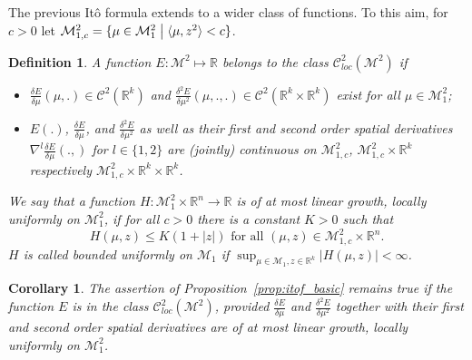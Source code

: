 \documentclass{article}
\newtheorem{definition}[theorem]{Definition}
\newcommand{\R}{\mathbb{R}}
\newcommand{\C}{\mathcal C}
\newcommand{\cM}{\mathcal M}
\newtheorem{corollary}[theorem]{Corollary}
\begin{document}
 
 



The previous It\^o formula extends to a wider class of functions. To this aim, for $c>0$ let
$\cM^2_{1,c}= \{\mu \in \cM^2_1 \bigm| \langle \mu,z^2\rangle <c\}$.

\begin{definition}
  \label{def:c2b_etc}
  A function $E\colon \cM^2 \mapsto \R$ belongs to the class $\C^2_{loc}(\cM^2)$ if
  \begin{itemize}
  \item $\frac{\delta E}{\delta \mu}(\mu,.) \in \C^2(\R^k) $ and
    $\frac{\delta^ 2 E}{\delta \mu^2}(\mu,.,.) \in \C^2(\R^k\times\R^k) $ exist for all $\mu \in \cM^2_1$;
  \item $E(.)$, $\frac{\delta E}{\delta \mu}$, and $\frac{\delta^ 2 E}{\delta \mu^2}$ as well as their first
    and second order spatial derivatives $\nabla^{l}\frac{\delta E}{\delta \mu}(.,)$ for $l\in \{1,2\}$ are
    (jointly) continuous on $\cM^2_{1,c}$, $\cM^2_{1,c}\times \R^k$ respectively $\cM^2_{1,c}\times \R^k\times \R^k$.
  \end{itemize}
  We say that a function $H\colon \cM^2_1\times \R^n \to \R $ is of \emph{at most linear growth, locally
    uniformly} on $\cM^2_1$, if for all $c>0$ there is a constant $K>0$ such that
  \[ H(\mu, z) \leq K (1+ |z|) \mbox{ for all } (\mu,z) \in \cM^2_{1,c} \times \R^n.\]
  $H$  is called \emph{bounded uniformly} on $\cM_1$ if  $\sup_{\mu \in \mathcal M_1, z \in \R^k } |H(\mu,z)| < \infty$. 
\end{definition}


\begin{corollary}
  \label{prop:itof_extended}
  The assertion of Proposition~\ref{prop:itof_basic} remains true if the function $E$ is in the class
  $\C^2_{loc}(\cM^2)$, provided $\frac{\delta E}{\delta \mu}$ and $\frac{\delta^ 2 E}{\delta \mu^2}$ together
  with their first and second order spatial derivatives are of at most linear growth, locally uniformly on
  $\cM^2_1$.
\end{corollary}
\end{document}
